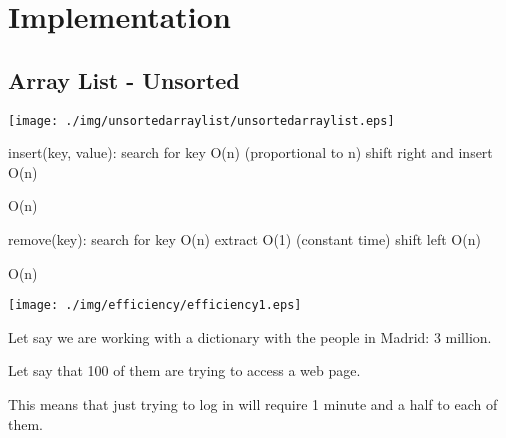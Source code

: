 \documentclass[a4paper, 9pt]{extarticle}
\begin{document}
\newpage

\section{Implementation}

\subsection{Array List - Unsorted}

\begin{center}
  \texttt{[image: ./img/unsortedarraylist/unsortedarraylist.eps]}
\end{center}

\begin{blackboard}
insert(key, value):
  search for key                              O(n)  (proportional to n)
  shift right and insert                      O(n)

                                              O(n)

remove(key):
  search for key                              O(n)
  extract                                     O(1)  (constant time)
  shift left                                  O(n)

                                              O(n)
\end{blackboard}

\begin{center}
  \texttt{[image: ./img/efficiency/efficiency1.eps]}
\end{center}

Let say we are working with a dictionary with the people in Madrid: 3 million.

Let say that 100 of them are trying to access a web page.

This means that just trying to log in will require 1 minute and a half to each of them.
\end{document}
